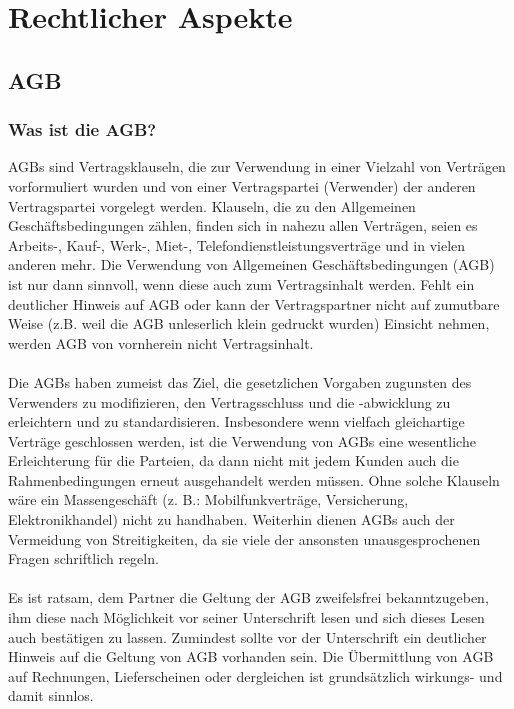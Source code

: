 \documentclass[a4paper]{article}
\begin{document}
\newpage
\section{Rechtlicher Aspekte}

\subsection{AGB}

\subsubsection{Was ist die AGB?}

AGBs sind Vertragsklauseln, die zur Verwendung in einer Vielzahl von Verträgen vorformuliert wurden und von einer Vertragspartei (Verwender) der anderen Vertragspartei vorgelegt werden. Klauseln, die zu den Allgemeinen Geschäftsbedingungen zählen, finden sich in nahezu allen Verträgen, seien es Arbeits-, Kauf-, Werk-, Miet-, Telefondienstleistungsverträge und in vielen anderen mehr. Die Verwendung von Allgemeinen Geschäftsbedingungen (AGB) ist nur dann sinnvoll, wenn diese auch zum Vertragsinhalt werden. Fehlt ein deutlicher Hinweis auf AGB oder kann der Vertragspartner nicht auf zumutbare Weise (z.B. weil die AGB unleserlich klein gedruckt wurden) Einsicht nehmen, werden AGB von vornherein nicht Vertragsinhalt.\\\\
Die AGBs haben zumeist das Ziel, die gesetzlichen Vorgaben zugunsten des Verwenders zu modifizieren, den Vertragsschluss und die -abwicklung zu erleichtern und zu standardisieren. Insbesondere wenn vielfach gleichartige Verträge geschlossen werden, ist die Verwendung von AGBs eine wesentliche Erleichterung für die Parteien, da dann nicht mit jedem Kunden auch die Rahmenbedingungen erneut ausgehandelt werden müssen. Ohne solche Klauseln wäre ein Massengeschäft (z. B.: Mobilfunkverträge, Versicherung, Elektronikhandel) nicht zu handhaben. Weiterhin dienen AGBs auch der Vermeidung von Streitigkeiten, da sie viele der ansonsten unausgesprochenen Fragen schriftlich regeln.\\\\
Es ist ratsam, dem Partner die Geltung der AGB zweifelsfrei bekanntzugeben, ihm diese nach Möglichkeit vor seiner Unterschrift lesen und sich dieses Lesen auch bestätigen zu lassen. Zumindest sollte vor der Unterschrift ein deutlicher Hinweis auf die Geltung von AGB vorhanden sein. Die Übermittlung von AGB auf Rechnungen, Lieferscheinen oder dergleichen ist grundsätzlich wirkungs- und damit sinnlos.
\end{document}
